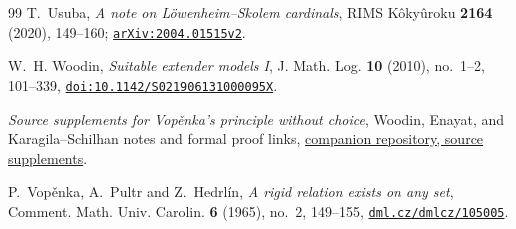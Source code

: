 \documentclass[11pt,a4paper]{amsart}
\theoremstyle{plain}
\theoremstyle{definition}
\theoremstyle{remark}
\begin{document}
\begin{thebibliography}{99}
T.~Usuba,
\emph{A note on L\"owenheim--Skolem cardinals},
RIMS K\^oky\^uroku \textbf{2164} (2020), 149--160;
\href{https://arxiv.org/abs/2004.01515}{\nolinkurl{arXiv:2004.01515v2}}.

W.~H. Woodin,
\emph{Suitable extender models I},
J. Math. Log. \textbf{10} (2010), no.~1--2, 101--339,
\href{https://doi.org/10.1142/S021906131000095X}{\nolinkurl{doi:10.1142/S021906131000095X}}.

{\color{auditgreen}
\emph{Source supplements for Vop\v{e}nka's principle without choice},
Woodin, Enayat, and Karagila--Schilhan notes and formal proof links,
\href{https://github.com/Tomodovodoo/vopenka-without-choice/tree/64b7ddeae680bb5ca581792ad56b55d2ad32683f/repairs}{companion repository, source supplements}.

P.~Vop\v{e}nka, A.~Pultr and Z.~Hedrl\'in,
\emph{A rigid relation exists on any set},
Comment. Math. Univ. Carolin. \textbf{6} (1965), no.~2, 149--155,
\href{https://dml.cz/dmlcz/105005}{\nolinkurl{dml.cz/dmlcz/105005}}.

}\end{thebibliography}
\end{document}
